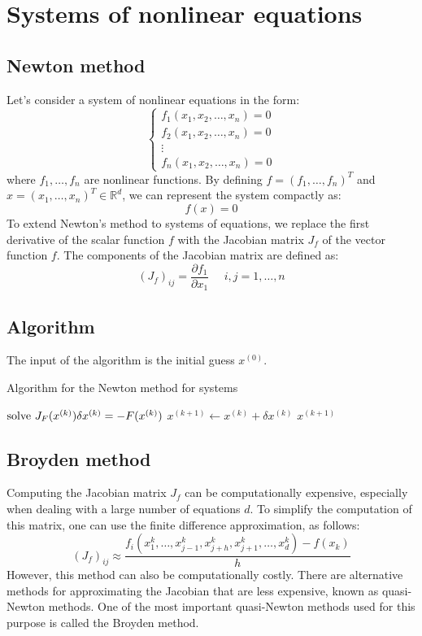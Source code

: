 \section{Systems of nonlinear equations}

\subsection*{Newton method}
Let's consider a system of nonlinear equations in the form:
\[\begin{cases}
    f_1(x_1,x_2,\dots,x_n)=0 \\
    f_2(x_1,x_2,\dots,x_n)=0 \\
    \vdots                   \\
    f_n(x_1,x_2,\dots,x_n)=0 
\end{cases}\]
where $f_1,\dots,f_n$ are nonlinear functions. 
By defining $f=(f_1,\dots,f_n)^T$ and $x=(x_1,\dots,x_n)^T \in \mathbb{R}^d$, we can represent the system compactly as:
\[f(x)=0\]
To extend Newton's method to systems of equations, we replace the first derivative of the scalar function $f$ with the Jacobian matrix $J_f$ of the vector function $f$.
The components of the Jacobian matrix are defined as:
\[(J_f)_{ij}=\dfrac{\partial f_1}{\partial x_1} \:\:\:\:\:\: i,j=1,\dots,n\]

\subsection*{Algorithm}
The input of the algorithm is the initial guess $x^{(0)}$. 
\begin{algorithm}[H]
    \caption{Algorithm for the Newton method for systems}
        \begin{algorithmic}[1]
                \State $\textnormal{solve  } J_{F}(x^{(k)})\delta x^{(k)}=-F(x^{(k)})$
                \State $x^{(k+1)} \leftarrow x^{(k)}+\delta x^{(k)}$
                    \State \Return $x^{(k+1)}$
                \EndIf
            \EndFor
        \end{algorithmic}
\end{algorithm}

\subsection*{Broyden method}
Computing the Jacobian matrix $J_f$ can be computationally expensive, especially when dealing with a large number of equations $d$. 
To simplify the computation of this matrix, one can use the finite difference approximation, as follows:
\[(J_f)_{ij} \approx \dfrac{f_i(x_1^{k},\dots,x_{j-1}^{k},x_{j+h}^{k},x_{j+1}^{k},\dots,x_{d}^{k})-f(x_{k})}{h}\]
However, this method can also be computationally costly.
There are alternative methods for approximating the Jacobian that are less expensive, known as quasi-Newton methods. 
One of the most important quasi-Newton methods used for this purpose is called the Broyden method.

